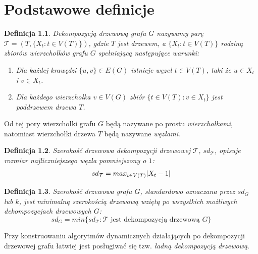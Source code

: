 \documentclass[12pt, oneside]{report}
\newtheorem{definition}{Definicja}
\begin{document}
\newpage
  	\chapter{Podstawowe definicje}
  	\label{definitions}
	
\begin{definition}
\em \emph{Dekompozycją drzewową grafu} $G$ nazywamy parę $\mathcal{T} = (T, \{X_t : t \in V(T)\})$, gdzie $T$ jest drzewem, a $\{X_t : t \in V(T)\}$ rodziną zbiorów wierzchołków grafu $G$ spełniającą następujące warunki:
\begin{enumerate}[label=(\roman*)]
	\item{Dla każdej krawędzi $\{u, v\} \in E(G)$ istnieje węzeł $t \in V(T)$, taki że $u \in X_t$ i $v \in X_t$.}
	\item{Dla każdego wierzchołka $v \in V(G)$ zbiór $\{t \in V(T): v \in X_t \}$ jest poddrzewem drzewa $T$.}
\end{enumerate}
\end{definition}

Od tej pory wierzchołki grafu $G$ będą nazywane po prostu \emph{wierzchołkami}, natomiast wierzchołki drzewa $T$ będą nazywane \emph{węzłami}.

\begin{definition}
\em \emph{Szerokość drzewowa dekompozycji drzewowej $\mathcal{T}$}, $sd_\mathcal{T}$, opisuje rozmiar najliczniejszego węzła pomniejszony o $1$: $$sd_\mathcal{T} = max_{t \in V(T)} \abs{X_t - 1}$$ 
\end{definition}

\begin{definition}
\em \emph{Szerokość drzewowa grafu $G$}, standardowo oznaczana przez $sd_G$ lub $k$, jest minimalną szerokością drzewową wziętą po wszystkich możliwych dekompozycjach drzewowych $G$: $$sd_G = min \{sd_\mathcal{T}: \mathcal{T} \text{ jest dekompozycją drzewową }G\}$$
\end{definition}

Przy konstruowaniu algorytmów dynamicznych działających po dekompozycji drzewowej grafu łatwiej jest posługiwać się tzw. \emph{ładną dekompozycją drzewową}.
\end{document}
